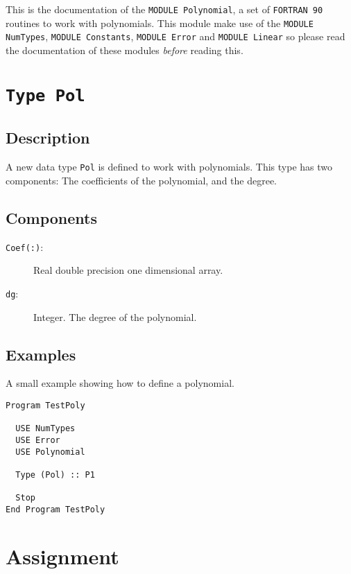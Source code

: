 This is the documentation of the \texttt{MODULE Polynomial}, a set
of \texttt{FORTRAN 90} routines to work with polynomials. This
module make use of the \texttt{MODULE NumTypes}, \texttt{MODULE
  Constants}, \texttt{MODULE Error} and \texttt{MODULE Linear} so
please read the documentation of these modules \emph{before} reading
this. 

\section{\texttt{Type Pol}}

\subsection{Description}

A new data type \texttt{Pol} is defined to work with polynomials. This
type has two components: The coefficients of the polynomial, and the
degree. 

\subsection{Components}

\begin{description}
\item[\texttt{Coef(:)}: ] Real double precision one dimensional
  array.
\item[\texttt{dg}:] Integer. The degree of the polynomial.
\end{description}

\subsection{Examples}

A small example showing how to define a polynomial.

\begin{lstlisting}[emph=Type,
                   emphstyle=\color{blue},
                   frame=trBL,
                   caption=Defining a polynomial.,
                   label=typepol]
Program TestPoly

  USE NumTypes
  USE Error
  USE Polynomial

  Type (Pol) :: P1

  Stop
End Program TestPoly
\end{lstlisting}

\section{Assignment}

